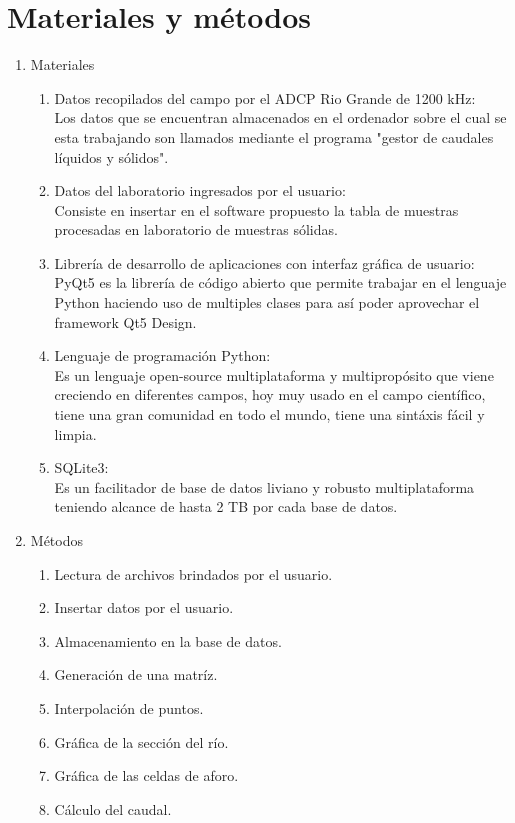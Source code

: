 \documentclass[12pt,a4paper]{report}
\begin{document}
\section{Materiales y métodos}
\begin{enumerate}
\item Materiales
	\begin{enumerate}
	\item Datos recopilados del campo por el ADCP Rio Grande de 1200 kHz: \\
	Los datos que se encuentran almacenados en el ordenador sobre el cual se esta trabajando son llamados mediante el programa "gestor de caudales líquidos y sólidos".
	\item Datos del laboratorio ingresados por el usuario: \\
	Consiste en insertar en el software propuesto la tabla de muestras procesadas en laboratorio de muestras sólidas.
	\item Librería de desarrollo de aplicaciones con interfaz gráfica de usuario: \\
	PyQt5 es la librería de código abierto que permite trabajar en el lenguaje Python haciendo uso de multiples clases para así poder aprovechar el framework Qt5 Design.
	\item Lenguaje de programación Python: \\
	Es un lenguaje open-source multiplataforma y multipropósito que viene creciendo en diferentes campos, hoy muy usado en el campo científico, tiene una gran comunidad en todo el mundo, tiene una sintáxis fácil y limpia.
	\item SQLite3: \\
	Es un facilitador de base de datos liviano y robusto multiplataforma teniendo alcance de hasta 2 TB por cada base de datos.
	
	\end{enumerate}
\item Métodos
	\begin{enumerate}
	\item Lectura de archivos brindados por el usuario.
	\item Insertar datos por el usuario.
	\item Almacenamiento en la base de datos.
	\item Generación de una matríz.
	\item Interpolación de puntos.
	\item Gráfica de la sección del río.
	\item Gráfica de las celdas de aforo.
	\item Cálculo del caudal.
	\end{enumerate}
\end{enumerate}
\end{document}
